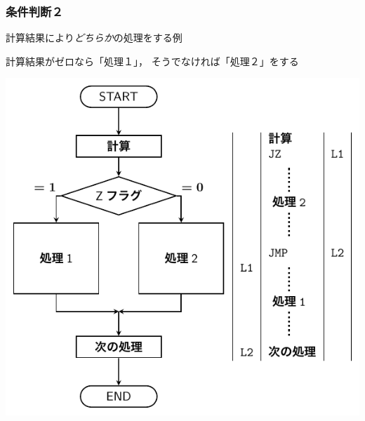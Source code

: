 \documentclass[handout]{beamer}        %
\begin{document}
\begin{frame}
  \frametitle{条件判断２}
  計算結果により\emph{どちらか}の処理をする例
  \vfill
  \begin{itembox}[l]{\footnotesize 計算結果がゼロなら「処理１」，
      そうでなければ「処理２」をする}
    \centerline{\includegraphics[scale=0.65]{../Tikz/flow2B.pdf}}
  \end{itembox}
  \vfill
\end{frame}
\end{document}
